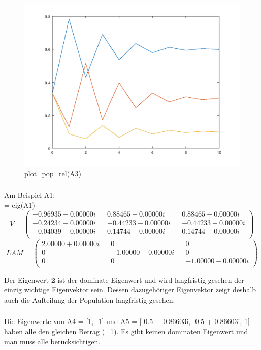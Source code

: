 \documentclass{article}
\begin{document}
\begin{figure}[H]
\centering
\includegraphics[scale=0.5]{plotrelA3.png}
\caption{plot\_pop\_rel(A3)}
\label{fig:universe}
\end{figure}

\subsubsection{}
Am Beispiel A1: \\
[V, LAM] = eig(A1)
\[
V =
  \begin{pmatrix}
    -0.96935 + 0.00000i && 0.88465 + 0.00000i && 0.88465 - 0.00000i \\ 
    -0.24234 + 0.00000i && -0.44233 - 0.00000i && -0.44233 + 0.00000i \\
    -0.04039 + 0.00000i &&  0.14744 + 0.00000i && 0.14744 - 0.00000i \\
  \end{pmatrix}
\]
\[
LAM =
  \begin{pmatrix}
    2.00000 + 0.00000i && 0 && 0 \\ 
    0 && -1.00000 + 0.00000i && 0 \\
    0 &&  0 &&  -1.00000 - 0.00000i \\
  \end{pmatrix}
\]

Der Eigenwert \textbf{2} ist der dominate Eigenwert und wird langfristig gesehen der einzig wichtige Eigenvektor sein. Dessen dazugehöriger Eigenvektor zeigt deshalb auch die Aufteilung der Population langfristig gesehen.

\subsubsection{}
Die Eigenwerte von A4 = [1, -1] und A5 = [-0.5 + 0.86603i, -0.5 + 0.86603i, 1] haben alle den gleichen Betrag (=1). Es gibt keinen dominaten Eigenwert und man muss alle berücksichtigen.
\end{document}
